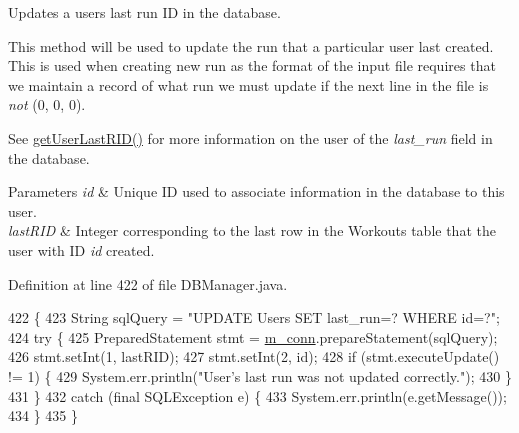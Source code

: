 Updates a user\textquotesingle{}s last run ID in the database.

This method will be used to update the run that a particular user last created. This is used when creating new run as the format of the input file requires that we maintain a record of what run we must update if the next line in the file is {\itshape not} (0, 0, 0).

See \mbox{\hyperlink{classcom_1_1activitytracker_1_1_d_b_manager_aab14c61b3f3a17bdea10cab1b5fd9337}{get\+User\+Last\+R\+I\+D()}} for more information on the user of the {\itshape last\+\_\+run} field in the database.


\begin{DoxyParams}{Parameters}
{\em id} & Unique ID used to associate information in the database to this user. \\
\hline
{\em last\+R\+ID} & Integer corresponding to the last row in the Workouts table that the user with ID {\itshape id} created. \\
\hline
\end{DoxyParams}


Definition at line 422 of file D\+B\+Manager.\+java.


\begin{DoxyCode}
422                                                                 \{
423         String sqlQuery = \textcolor{stringliteral}{"UPDATE Users SET last\_run=? WHERE id=?"};
424         \textcolor{keywordflow}{try} \{
425             PreparedStatement stmt = \mbox{\hyperlink{classcom_1_1activitytracker_1_1_d_b_manager_a064088d13ac09eb147fdc19268771521}{m\_conn}}.prepareStatement(sqlQuery);
426             stmt.setInt(1, lastRID);
427             stmt.setInt(2, \textcolor{keywordtype}{id});
428             \textcolor{keywordflow}{if} (stmt.executeUpdate() != 1) \{
429                 System.err.println(\textcolor{stringliteral}{"User's last run was not updated correctly."});
430             \}
431         \}
432         \textcolor{keywordflow}{catch} (\textcolor{keyword}{final} SQLException e) \{
433             System.err.println(e.getMessage());
434         \}
435     \}
\end{DoxyCode}
\mbox{\label{classcom_1_1activitytracker_1_1_d_b_manager_af05d79f33ecf2920a67d1b9cf82c079f}} 
